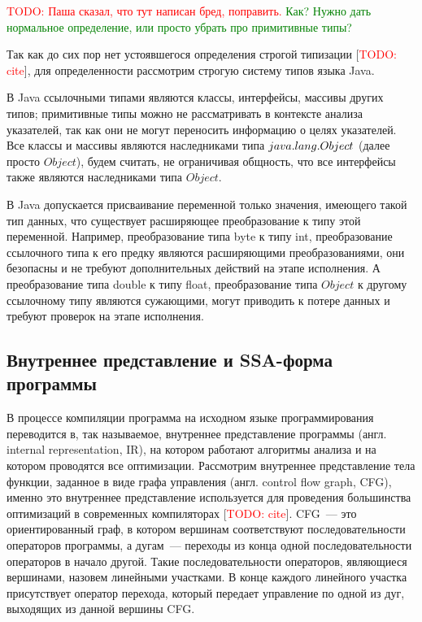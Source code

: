 \documentclass[14pt,titlepage]{extarticle}
\newcommand{\remark}[1]{\textcolor{Green}{#1}}
\newcommand{\todo}[1]{\textcolor{red}{TODO: #1}}
\newcommand{\todocite}{[\todo{cite}]}
\newcommand{\eng}[1]{{\English#1}}
\begin{document}
      \todo{Паша сказал, что тут написан бред, поправить.}
      \remark{Как? Нужно дать нормальное определение, или просто убрать
      про примитивные типы?}

      Так как до сих пор нет устоявшегося определения строгой типизации
      \todocite, для определенности рассмотрим строгую систему типов языка
      Java.

      В Java ссылочными типами являются классы, интерфейсы, массивы других
      типов; примитивные типы можно не рассматривать в контексте анализа
      указателей, так как они не могут переносить информацию о целях
      указателей. Все классы и массивы являются наследниками типа
      $java\-.lang\-.Object$ (далее просто $Object$), будем считать,
      не ограничивая общность, что все интерфейсы также являются
      наследниками типа $Object$.

      В Java допускается присваивание переменной только значения, имеющего
      такой тип данных, что существует расширяющее преобразование к типу этой
      переменной.
      Например, преобразование типа byte к типу int, преобразование ссылочного
      типа к его предку являются расширяющими преобразованиями, они безопасны и
      не требуют дополнительных действий на этапе исполнения.
      А преобразование типа double к типу float, преобразование типа $Object$ к
      другому ссылочному типу являются сужающими, могут приводить к потере
      данных и требуют проверок на этапе исполнения.

    \subsection{Внутреннее представление и SSA-форма программы}
      \label{section:ir_and_ssa}

      В процессе компиляции программа на исходном языке программирования
      переводится в, так называемое, внутреннее представление программы
      (англ. \eng{internal representation, IR}), на котором работают
      алгоритмы анализа и на котором проводятся все оптимизации.
      Рассмотрим внутреннее представление тела функции, заданное в виде
      графа управления (англ. \eng{control flow graph, CFG}), именно это
      внутреннее представление используется для проведения большинства
      оптимизаций в современных компиляторах \todocite.
      CFG~--- это ориентированный граф, в котором вершинам соответствуют
      последовательности операторов программы, а дугам~--- переходы из конца
      одной последовательности операторов в начало другой. Такие
      последовательности операторов, являющиеся вершинами, назовем линейными
      участками. В конце каждого линейного участка присутствует оператор
      перехода, который передает управление по одной из дуг, выходящих из
      данной вершины CFG.
\end{document}
